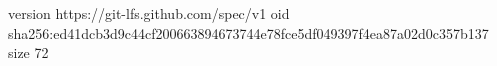 version https://git-lfs.github.com/spec/v1
oid sha256:ed41dcb3d9c44cf200663894673744e78fce5df049397f4ea87a02d0c357b137
size 72
